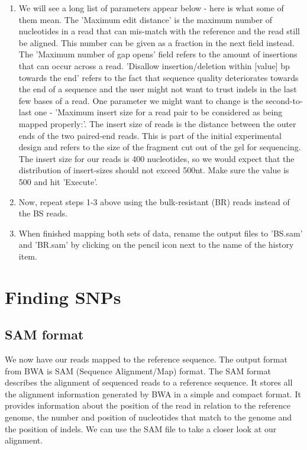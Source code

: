 \documentclass[12pt,a4paper]{article}
\begin{document}
\begin{enumerate}
	\item We will see a long list of parameters appear below -
          here is what some of them mean. The 'Maximum edit distance'
          is the maximum number of nucleotides in a read that can
          mis-match with the reference and the read still be
          aligned. This number can be given as a fraction in the next
          field instead. The 'Maximum number of gap opens' field
          refers to the amount of insertions that can occur across a
          read. 'Disallow insertion/deletion within [value] bp towards
          the end' refers to the fact that sequence quality
          deteriorates towards the end of a sequence and the user
          might not want to trust indels in the last few bases of a
          read. One parameter we might want to change is the
          second-to-last one - 'Maximum insert size for a read pair to
          be considered as being mapped properly:'. The insert size of
          reads is the distance between the outer ends of the two
          paired-end reads. This is part of the initial experimental
          design and refers to the size of the fragment cut out of the
          gel for sequencing. The insert size for our reads is 400
          nucleotides, so we would expect that the distribution of
          insert-sizes should not exceed 500nt. Make sure the value is
          500 and hit 'Execute'.
	\item Now, repeat steps 1-3 above using the bulk-resistant
          (BR) reads instead of the BS reads.
	\item When finished mapping both sets of data, rename the
          output files to 'BS.sam' and 'BR.sam' by clicking on the
          pencil icon next to the name of the history item.
\end{enumerate}

\section{Finding SNPs}

\subsection{SAM format}

We now have our reads mapped to the reference sequence. The
output format from BWA is SAM (Sequence Alignment/Map) format. The SAM
format describes the alignment of sequenced reads to a reference
sequence. It stores all the alignment information generated by BWA in
a simple and compact format. It provides information about the
position of the read in relation to the reference genome, the number
and position of nucleotides that match to the genome and the position
of indels. We can use the SAM file to take a closer look at our
alignment.\\
\end{document}
